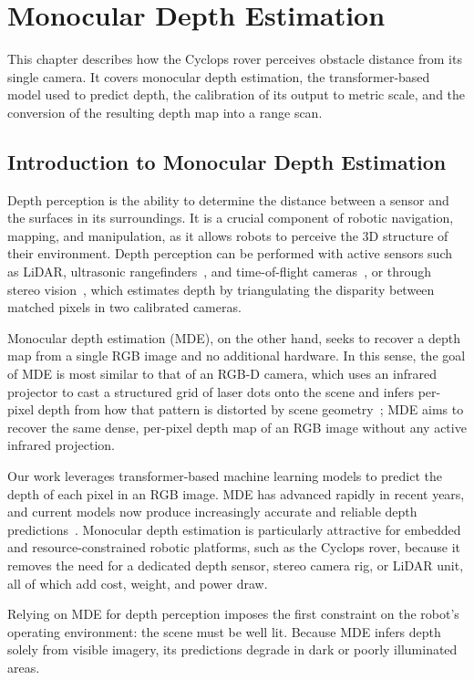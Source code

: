 \chapter{Monocular Depth Estimation}
\label{ch:mde}

This chapter describes how the Cyclops rover perceives obstacle distance from its single camera. It
covers monocular depth estimation, the transformer-based model used to predict depth, the calibration
of its output to metric scale, and the conversion of the resulting depth map into a range scan.

\section{Introduction to Monocular Depth Estimation}
Depth perception is the ability to determine the distance between a sensor and
the surfaces in its surroundings. It is a crucial component of robotic
navigation, mapping, and manipulation, as it allows
robots to perceive the 3D structure of their environment.
Depth perception can be performed with active sensors such as
LiDAR, ultrasonic rangefinders~\cite{Moravec_Sonar}, and
time-of-flight cameras~\cite{ToF}, or through stereo
vision~\cite{stereo}, which estimates depth by triangulating the disparity
between matched pixels in two calibrated cameras.


Monocular depth estimation (MDE), on the other hand, seeks to recover a depth map
from a single RGB image and no additional hardware. In this sense, the goal of MDE is most similar
to that of an RGB-D camera, which uses an infrared projector to cast a structured grid of laser dots
onto the scene and infers per-pixel depth from how that pattern is distorted by scene geometry~\cite{rgbd}; MDE
aims to recover the same dense, per-pixel depth map of an RGB image without
any active infrared projection. 


Our work leverages transformer-based machine learning models to predict 
the depth of each pixel in an RGB image. MDE has advanced rapidly in recent years, and
current models now produce increasingly accurate and reliable depth predictions~\cite{DPT,zoedepth,DepthAnythingV2}.
Monocular depth estimation is particularly attractive for embedded and resource-constrained
robotic platforms, such as the Cyclops rover, because it removes the need for a
dedicated depth sensor, stereo camera rig, or LiDAR unit, all of which add cost, weight,
and power draw.

Relying on MDE for depth perception imposes the first constraint on the robot's
operating environment: the scene must be well lit. Because MDE infers depth solely
from visible imagery, its predictions degrade in dark or poorly
illuminated areas.


